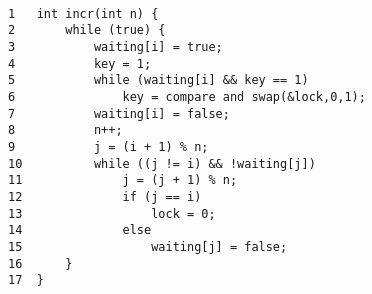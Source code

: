 \documentclass{amsart}
\begin{document}
\begin{enumerate}
            \begin{lstlisting}[escapechar=@]
    
1   int incr(int n) {
2       while (true) {
3           waiting[i] = true;
4           key = 1;
5           while (waiting[i] && key == 1)
6               key = compare and swap(&lock,0,1); 
7           waiting[i] = false;
8           n++;
9           j = (i + 1) % n;
10          while ((j != i) && !waiting[j])
11              j = (j + 1) % n;
12              if (j == i)
13                  lock = 0;
14              else
15                  waiting[j] = false;
16      }
17  }
            \end{lstlisting}
            
    \end{enumerate}
\end{document}
